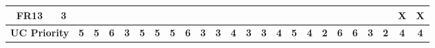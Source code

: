 \documentclass[11pt]{article}
\begin{document}
\begin{landscape}
\begin{table}[ht!]
{\begin{tabular}{|c|c|c|c|c|c|c|c|c|c|c|c|c|c|c|c|c|c|c|c|c|c|c|c|c|}
						\textbf{FR13}         & \textbf{3}         & \textbf{}  & \textbf{}  & \textbf{}  & \textbf{}  & \textbf{}  & \textbf{}  & \textbf{}  & \textbf{}  & \textbf{}  & \textbf{}  & \textbf{}  & \textbf{}  & \textbf{}  & \textbf{}  & \textbf{}  & \textbf{}  & \textbf{}  & \textbf{}  & \textbf{}  & \textbf{}  & \textbf{}  & \textbf{X} & \textbf{X} \\ \hline
						\multicolumn{2}{|c|}{\textbf{UC Priority}} & \textbf{5} & \textbf{5} & \textbf{6} & \textbf{3} & \textbf{5} & \textbf{5} & \textbf{5} & \textbf{6} & \textbf{3} & \textbf{3} & \textbf{4} & \textbf{3} & \textbf{3} & \textbf{4} & \textbf{5} & \textbf{4} & \textbf{2} & \textbf{6} & \textbf{6} & \textbf{3} & \textbf{2} & \textbf{4} & \textbf{4} \\ \hline
					\end{tabular}%
				}
			\end{table}
		\end{landscape}
		
\end{document}
